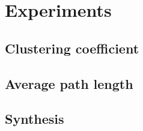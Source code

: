 
\section{Experiments}
\label{sec:experiments}

\subsection{Clustering coefficient}

\subsection{Average path length}

\subsection{Synthesis}

